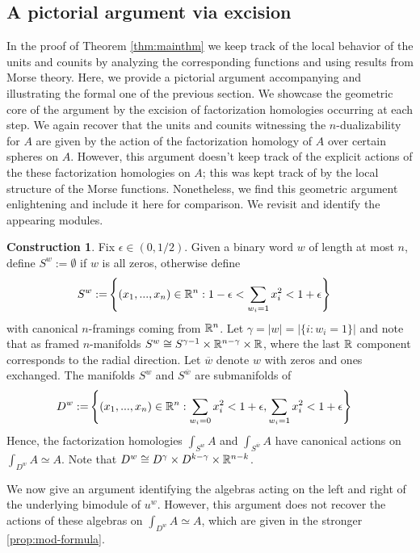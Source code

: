 \documentclass[10pt, reqno, twoside
, final
]{amsart}
\numberwithin{equation}{subsection}%
\theoremstyle{definition}
\theoremstyle{definition}
\theoremstyle{definition}
\theoremstyle{definition}
\newtheorem{cons}[defn]{Construction}
\theoremstyle{definition}
\theoremstyle{definition}
\theoremstyle{definition}
\theoremstyle{definition}
\theoremstyle{definition}
\theoremstyle{plain}
\theoremstyle{definition}
\theoremstyle{plain}
\theoremstyle{definition}
\theoremstyle{plain}
\theoremstyle{definition}
\theoremstyle{definition}
\theoremstyle{plain}
\theoremstyle{plain}
\theoremstyle{definition}
\theoremstyle{plain}
\theoremstyle{plain}
\theoremstyle{plain}
\begin{document}
\subsection{A pictorial argument via excision}\label{sec:geometric_part_old}


In the proof of Theorem \ref{thm:mainthm} we keep track of the local behavior of the units and counits by analyzing the corresponding functions and using results from Morse theory.
Here, we provide a pictorial argument accompanying and illustrating the formal one of the previous section.
We showcase the geometric core of the argument by the excision of factorization homologies occurring at each step.
We again recover that the units and counits witnessing the $n$-dualizability for $A$ are given by the action of the factorization homology of $A$ over certain spheres on $A$. However, this argument doesn't keep track of the explicit actions of the these factorization homologies on $A$; this was kept track of by the local structure of the Morse functions. Nonetheless, we find this geometric argument enlightening and include it here for comparison. We revisit  and identify the appearing modules.

\begin{cons}
Fix $\epsilon \in (0,1/2)$. Given a binary word $w$ of length at most $n$, define $S^{w} :=\emptyset$ if $w$ is all zeros, otherwise define
\begin{align}
    S^w :=& \left\{(x_1,...,x_n) \in \mathbb{R}^{n} : 1-\epsilon < \sum_{w_i=1} x_i^2 <  1+\epsilon \right\} 
\end{align}
with canonical $n$-framings coming from $\mathbb{R}^n$. Let $\gamma = |w| = |\{i:w_i=1\}|$ and note that as framed $n$-manifolds $S^{w} \cong S^{\gamma-1} \times \mathbb{R}^{n-\gamma}\times \mathbb{R}$, where the last $\mathbb{R}$ component corresponds to the radial direction. Let $\overline{w}$ denote $w$ with zeros and ones exchanged. The manifolds $S^w$ and $S^{\overline{w}}$ are submanifolds of
\begin{align}
    D^w :=& \left\{ (x_1,...,x_n) \in \mathbb{R}^{n} : \sum_{w_i=0} x_i^2 < 1 + \epsilon , \sum_{w_i=1} x_i^2 < 1+\epsilon \right\} 
\end{align}
Hence, the factorization homologies $\int_{S^w} A$ and $\int_{S^{\overline{w}}} A$ have canonical actions on $\int_{D^{w}} A \simeq A$. Note that $D^{w} \cong D^{\gamma} \times D^{k-\gamma} \times \mathbb{R}^{n-k}$.
\end{cons}

We now give an argument identifying the algebras acting on the left and right of the underlying bimodule of $u^w$. However, this argument does not recover the actions of these algebras on $\int_{D^w} A \simeq A$, which are given in the stronger \cref{prop:mod-formula}.
\end{document}
